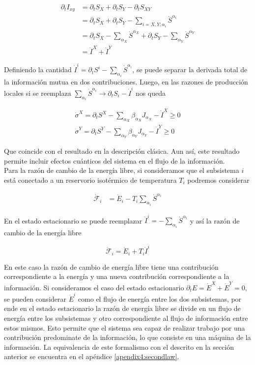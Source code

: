\begin{align*}
    \partial_{t}I_{xy} & = \partial_{t}S_{X} + \partial_{t}S_{Y} - \partial_{t}S_{XY} \\
        & = \partial_{t}S_{X} + \partial_{t}S_{Y} - \sum_{i=X,Y;\alpha_{i}}\dot{S}^{\alpha_{i}} \\
        & =  \partial_{t}S_{X} - \sum_{\alpha_{X}} \dot{S}^{\alpha_{X}} + \partial_{t}S_{Y} - \sum_{\alpha_{Y}} \dot{S}^{\alpha_{Y}} \\
        & = \dot{I}^{X} + \dot{I}^{Y}
\end{align*}

Definiendo la cantidad $\dot{I}^{i} = \partial_{t}S^{i} - \sum_{\alpha_{i}} \dot{S}^{\alpha_{i}} $, se puede separar la derivada total de la información mutua en dos contribuciones. Luego, en las razones de producción locales si se reemplaza $\sum_{\alpha_{i}}\dot{S}^{\alpha_{i}} \to \partial_{t}S_{i} - \dot{I}^{i} $ nos queda 

\begin{align*}
    \dot{\sigma}^{X} = \partial_{t}S^{X} - \sum_{\alpha_{X}} \beta_{\alpha_{X}} J_{\alpha_{X}} - \dot{I}^{X} \geq 0 \\
    \dot{\sigma}^{Y} = \partial_{t}S^{Y} - \sum_{\alpha_{Y}} \beta_{\alpha_{Y}} J_{\alpha_{Y}} - \dot{I}^{Y} \geq 0
\end{align*}

Que coincide con el resultado en la descripción clásica. Aun así, este resultado permite incluir efectos cuánticos del sistema en el flujo de la información.\\
Para la razón de cambio de la energía libre, si consideramos que el subsistema $i$ está conectado a un reservorio isotérmico de temperatura $T_{i}$ podremos considerar

\begin{align*}
    \dot{\mathcal{F}}_{i} & = \dot{E}_{i} - T_{i} \sum_{\alpha_{i}}\dot{S}^{\alpha_{i}} 
\end{align*}

En el estado estacionario se puede reemplazar $\dot{I}^{i} = - \sum_{\alpha_{i}}\dot{S}^{\alpha_{i}}$ y así la razón de cambio de la energía libre
\label{sec4:flujos0}

\begin{equation*}
    \dot{\mathcal{F}}_{i} = \dot{E}_{i} + T_{i} \dot{I}^{i}
\end{equation*}

En este caso la razón de cambio de energía libre tiene una contribución correspondiente a la energía y una nueva contribución correspondiente a la información. Si consideramos el caso del estado estacionario $\partial_{t}E = \dot{E}^{X} + \dot{E}^{Y} = 0$, se pueden considerar $\dot{E}^{i}$ como el flujo de energía entre los dos subsistemas, por ende en el estado estacionario la razón de energía libre se divide en un flujo de energía entre los subsistemas y otro correspondiente al flujo de información entre estos mismos. Esto permite que el sistema sea capaz de realizar trabajo por una contribución predominate de la información, lo que consiste en una máquina de la información. La equivalencia de este formalismo con el descrito en la sección anterior se encuentra en el apéndice \ref{apendix4:secondlaw}.



